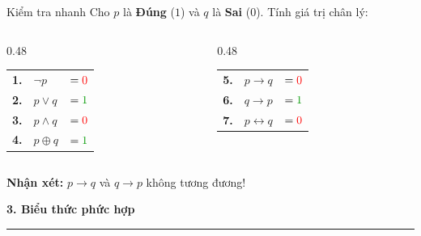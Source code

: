 \documentclass[aspectratio=169, 11pt]{beamer}
\begin{document}
\begin{frame}{Kiểm tra nhanh}
Cho $p$ là \textbf{Đúng} ($1$) và $q$ là \textbf{Sai} ($0$). Tính giá trị chân lý:

\vspace{0.4cm}
\begin{columns}[T, onlytextwidth]
  \begin{column}{0.48\textwidth}
    \centering
    \begin{tabular}[t]{lll}
      \textcolor{uitblue}{\textbf{1.}} & $\neg p$ & $= \textcolor{red}{0}$ \\[6pt]
      \textcolor{uitblue}{\textbf{2.}} & $p \lor q$ & $= \textcolor{green!60!black}{1}$ \\[6pt]
      \textcolor{uitblue}{\textbf{3.}} & $p \land q$ & $= \textcolor{red}{0}$ \\[6pt]
      \textcolor{uitblue}{\textbf{4.}} & $p \oplus q$ & $= \textcolor{green!60!black}{1}$
    \end{tabular}
  \end{column}
  \begin{column}{0.48\textwidth}
    \centering
    \begin{tabular}[t]{lll}
      \textcolor{uitblue}{\textbf{5.}} & $p \rightarrow q$ & $= \textcolor{red}{0}$ \\[6pt]
      \textcolor{uitblue}{\textbf{6.}} & $q \rightarrow p$ & $= \textcolor{green!60!black}{1}$ \\[6pt]
      \textcolor{uitblue}{\textbf{7.}} & $p \leftrightarrow q$ & $= \textcolor{red}{0}$
    \end{tabular}
  \end{column}
\end{columns}

\vspace{0.4cm}
\centering
\textbf{Nhận xét:} $p \rightarrow q$ và $q \rightarrow p$ không tương đương!
\end{frame}

\begin{frame}[plain]
  \centering
  \vspace*{2.2cm}
  {\Huge\textbf{\color{uitblue}3. Biểu thức phức hợp}}
  \par\vspace{0.4cm}
  {\color{uitblue}\rule{0.55\textwidth}{1.2pt}}
\end{frame}
\end{document}
